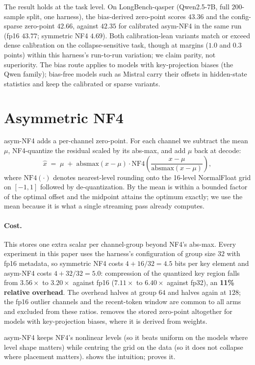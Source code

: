 \documentclass{article}
\theoremstyle{plain}
\theoremstyle{definition}
\newcommand{\absmax}{\mathrm{absmax}}
\newcommand{\NF}{\mathrm{NF4}}
\begin{document}
The result holds at the task level. On LongBench-qasper (Qwen2.5-7B, full $200$-sample split,
one harness), the bias-derived zero-point scores $\mathbf{43.36}$ and the config-sparse
zero-point $42.66$, against $42.35$ for calibrated asym-NF4 in the same run (fp16 $43.77$;
symmetric NF4 $4.69$). Both calibration-lean variants match or exceed dense calibration on the
collapse-sensitive task, though at margins ($1.0$ and $0.3$ points) within this harness's
run-to-run variation; we claim parity, not superiority. The bias route applies to models with
key-projection biases (the Qwen family); bias-free models such as Mistral carry their offsets in
hidden-state statistics and keep the calibrated or sparse variants.

\section{Asymmetric NF4}
\label{sec:method}
asym-NF4 adds a per-channel zero-point. For each channel we subtract the mean $\mu$,
NF4-quantize the residual scaled by its abs-max, and add $\mu$ back at decode:
\[
\hat{x} \;=\; \mu \;+\; \absmax(x-\mu)\cdot
\NF\!\left(\frac{x-\mu}{\absmax(x-\mu)}\right),
\]
where $\NF(\cdot)$ denotes nearest-level rounding onto the 16-level NormalFloat grid on
$[-1,1]$ followed by de-quantization. By  the mean is within a bounded factor of
the optimal offset and the midpoint attains the optimum exactly; we use the mean because it is
what a single streaming pass already computes.

\paragraph{Cost.}
This stores one extra scalar per channel-group beyond NF4's abs-max. Every experiment in this
paper uses the harness's configuration of group size $32$ with fp16 metadata, so symmetric NF4
costs $4 + 16/32 = 4.5$ bits per key element and asym-NF4 costs $4 + 32/32 = 5.0$: compression
of the quantized key region falls from $3.56\times$ to $3.20\times$ against fp16
($7.11\times$ to $6.40\times$ against fp32), an \textbf{11\% relative overhead}. The
overhead halves at group $64$ and halves again at $128$; the fp16 outlier channels and the
recent-token window are common to all arms and excluded from these ratios. 
removes the stored zero-point altogether for models with key-projection biases, where it is
derived from weights.

asym-NF4 keeps NF4's nonlinear levels (so it beats uniform on the models where level shape
matters) while centring the grid on the data (so it does not collapse where placement matters).
 shows the intuition;  proves it.
\end{document}
